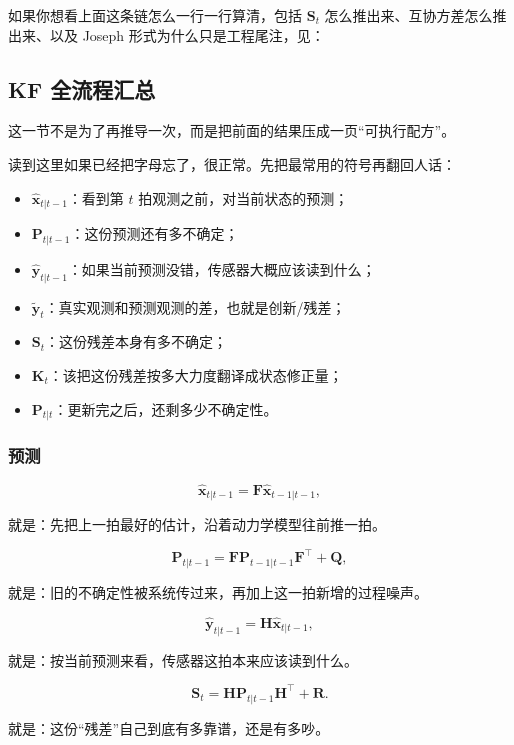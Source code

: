 \documentclass[12pt,a4paper]{ctexart}
\begin{document}
如果你想看上面这条链怎么一行一行算清，包括
\(\bm{S}_t\)
怎么推出来、互协方差怎么推出来、以及 Joseph 形式为什么只是工程尾注，见：

\begin{quote}
\end{quote}

\subsection{KF 全流程汇总}

这一节不是为了再推导一次，而是把前面的结果压成一页“可执行配方”。

读到这里如果已经把字母忘了，很正常。先把最常用的符号再翻回人话：
\begin{itemize}
  \item \(\hat{\bm{x}}_{t|t-1}\)：看到第 \(t\) 拍观测之前，对当前状态的预测；
  \item \(\bm{P}_{t|t-1}\)：这份预测还有多不确定；
  \item \(\hat{\bm{y}}_{t|t-1}\)：如果当前预测没错，传感器大概应该读到什么；
  \item \(\tilde{\bm{y}}_t\)：真实观测和预测观测的差，也就是创新/残差；
  \item \(\bm{S}_t\)：这份残差本身有多不确定；
  \item \(\bm{K}_t\)：该把这份残差按多大力度翻译成状态修正量；
  \item \(\bm{P}_{t|t}\)：更新完之后，还剩多少不确定性。
\end{itemize}

\subsubsection{预测}

\[
\hat{\bm{x}}_{t|t-1} = \bm{F}\hat{\bm{x}}_{t-1|t-1},
\]

就是：先把上一拍最好的估计，沿着动力学模型往前推一拍。

\[
\bm{P}_{t|t-1} = \bm{F}\bm{P}_{t-1|t-1}\bm{F}^\top + \bm{Q},
\]

就是：旧的不确定性被系统传过来，再加上这一拍新增的过程噪声。

\[
\hat{\bm{y}}_{t|t-1} = \bm{H}\hat{\bm{x}}_{t|t-1},
\]

就是：按当前预测来看，传感器这拍本来应该读到什么。

\[
\bm{S}_t = \bm{H}\bm{P}_{t|t-1}\bm{H}^\top + \bm{R}.
\]

就是：这份“残差”自己到底有多靠谱，还是有多吵。
\end{document}
